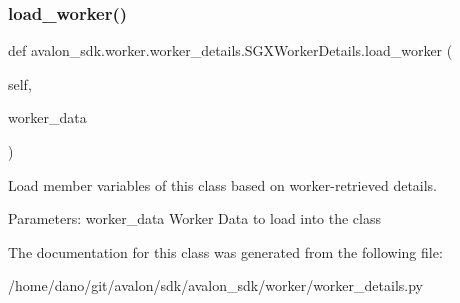 \subsubsection{\texorpdfstring{load\+\_\+worker()}{load\_worker()}}
{\footnotesize\ttfamily def avalon\+\_\+sdk.\+worker.\+worker\+\_\+details.\+S\+G\+X\+Worker\+Details.\+load\+\_\+worker (\begin{DoxyParamCaption}\item[{}]{self,  }\item[{}]{worker\+\_\+data }\end{DoxyParamCaption})}

\begin{DoxyVerb}Load member variables of this class
based on worker-retrieved details.

Parameters:
    worker_data Worker Data to load into the class
\end{DoxyVerb}
 

The documentation for this class was generated from the following file\+:\begin{DoxyCompactItemize}
\item 
/home/dano/git/avalon/sdk/avalon\+\_\+sdk/worker/worker\+\_\+details.\+py\end{DoxyCompactItemize}
